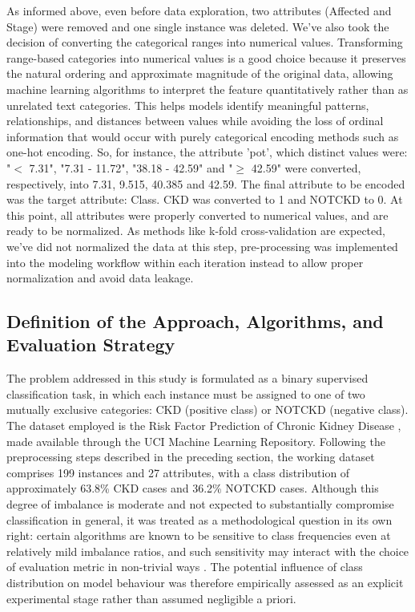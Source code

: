 As informed above, even before data exploration, two attributes (Affected and Stage) were removed and one single instance was deleted.
We've also took the decision of converting the categorical ranges into numerical values. Transforming range-based categories into numerical values is a
good choice because it preserves the natural ordering and approximate magnitude of the original data, allowing machine learning algorithms to interpret
the feature quantitatively rather than as unrelated text categories. This helps models identify meaningful patterns, relationships, and distances between
values while avoiding the loss of ordinal information that would occur with purely categorical encoding methods such as one-hot encoding.
So, for instance, the attribute 'pot', which distinct values were: "$<$ 7.31", "7.31 - 11.72", "38.18 - 42.59" and "$\geq$ 42.59" were converted, respectively,
into 7.31, 9.515, 40.385 and 42.59.
The final attribute to be encoded was the target attribute: Class. CKD was converted to 1 and NOTCKD to 0.
At this point, all attributes were properly converted to numerical values, and are ready to be normalized. As methods like k-fold cross-validation are expected,
we've did not normalized the data at this step, pre-processing was implemented into the modeling workflow within each iteration instead to allow proper normalization and avoid data leakage.


\subsection{Definition of the Approach, Algorithms, and Evaluation Strategy}

The problem addressed in this study is formulated as a binary supervised classification task, in
which each instance must be assigned to one of two mutually exclusive categories: CKD (positive
class) or NOTCKD (negative class). The dataset employed is the Risk Factor Prediction of Chronic
Kidney Disease \cite{risk_factor_prediction_of_chronic_kidney_disease_857}, made available through
the UCI Machine Learning Repository. Following the preprocessing steps described in the preceding
section, the working dataset comprises 199 instances and 27 attributes, with a class distribution
of approximately 63.8\% CKD cases and 36.2\% NOTCKD cases. Although this degree of imbalance is
moderate and not expected to substantially compromise classification in general, it was treated as a
methodological question in its own right: certain algorithms are known to be sensitive to class
frequencies even at relatively mild imbalance ratios, and such sensitivity may interact with the
choice of evaluation metric in non-trivial ways \cite{he2009imbalanced}. The potential influence of
class distribution on model behaviour was therefore empirically assessed as an explicit experimental
stage rather than assumed negligible a priori.

